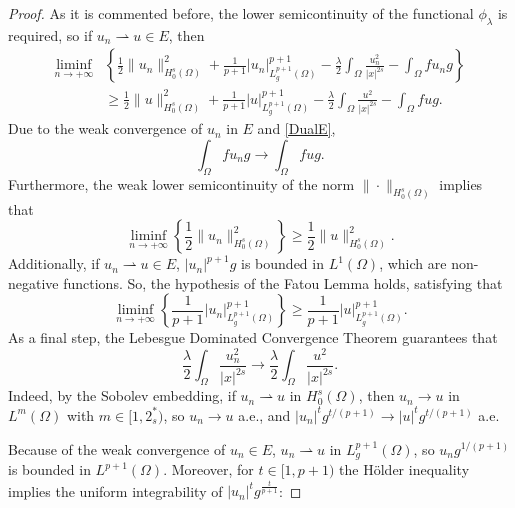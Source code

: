 \documentclass[preprint,12pt]{elsarticle}
\begin{document}
		
		
		\begin{proof}
			As it is commented before, the lower semicontinuity of the functional $\phi_{\lambda}$ is required, so if $u_n\rightharpoonup u \in E$, then 			
			\begin{align}\label{solutionminimum}
				\liminf_{n\rightarrow +\infty} &\left\{\frac{1}{2}\|u_n\|^2_{H^s_0(\Omega)}+\frac{1}{p+1}|u_n|^{p+1}_{L^{p+1}_g(\Omega)}-\frac{\lambda}{2}\int_{\Omega}\frac{u_n^2}{|x|^{2s}}-\int_{\Omega}fu_ng \right\}\\
				& \geq \frac{1}{2}\|u\|^2_{H^s_0(\Omega)}+\frac{1}{p+1}|u|^{p+1}_{L^{p+1}_g(\Omega)}-\frac{\lambda}{2}\int_{\Omega}\frac{u^2}{|x|^{2s}}-\int_{\Omega}fug.
				\nonumber
			\end{align}
			Due to the weak convergence of $u_n$ in $E$ and \eqref{DualE}, 
			\begin{equation}\label{solutionminimum1}
				\int_{\Omega}fu_ng \rightarrow \int_{\Omega}fug.
			\end{equation}
			Furthermore, the weak lower semicontinuity of the norm $\|\cdot\|_{H^s_0(\Omega)}$ implies that
			\begin{equation}\label{solutionminimum2}
				\liminf_{n\rightarrow +\infty}\left\{\frac{1}{2}\|u_n\|^2_{H^s_0(\Omega)}\right\}\geq \frac{1}{2}\|u\|^2_{H^s_0(\Omega)}.
			\end{equation}
			Additionally, if $u_n\rightharpoonup u \in E$,  $|u_n|^{p+1}g$ is bounded in $L^{1}(\Omega)$, which are non-negative functions. So, the hypothesis of the Fatou Lemma holds, satisfying that
			\begin{equation}\label{solutionminimum3}
				\liminf_{n\rightarrow +\infty}\left\{\frac{1}{p+1}|u_n|^{p+1}_{L^{p+1}_g(\Omega)}\right\} \geq \frac{1}{p+1}|u|^{p+1}_{L^{p+1}_g(\Omega)}.
			\end{equation}	
			As a final step, the Lebesgue Dominated Convergence Theorem guarantees that 
			\begin{equation}\label{solutionminimum4}
				\frac{\lambda}{2}\int_{\Omega}\frac{u_n^2}{|x|^{2s}}\rightarrow \frac{\lambda}{2}\int_{\Omega}\frac{u^2}{|x|^{2s}}.
			\end{equation}
			Indeed, by the Sobolev embedding, if  $u_n\rightharpoonup u$ in $H^s_0(\Omega)$, then $u_n\rightarrow u$ in $L^m(\Omega)$ with $m\in [1,2_s^*)$, so $u_n\rightarrow u$ a.e., and $|u_n|^{t}g^{t/(p+1)}\rightarrow |u|^{t}g^{t/(p+1)}$ a.e.\par 
			Because of the weak convergence of $u_n\in E$,  $u_n\rightharpoonup u $ in $L^{p+1}_g(\Omega)$, so $u_ng^{1/(p+1)}$ is bounded in $L^{p+1}(\Omega)$. Moreover, for $t\in [1,p+1)$ the H\"older inequality implies the uniform integrability of $|u_n|^{t}g^{\frac{t}{p+1}}$:      

\end{proof}
\end{document}

